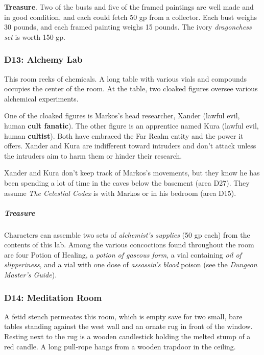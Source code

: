 \documentclass[10pt,a4paper,twoside,bg=print,twocolumn,openany,nodeprecatedcode]{dndbook}
\begin{document}
\textbf{Treasure}. Two of the busts and five of the framed paintings are well made and in good condition, and each could fetch 50 gp from a collector. Each bust weighs 30 pounds, and each framed painting weighs 15 pounds. The ivory \textit{dragonchess set} is worth 150 gp.

\subsubsection{D13: Alchemy Lab}
\begin{DndReadAloud}{}
This room reeks of chemicals. A long table with various vials and compounds occupies the center of the room. At the table, two cloaked figures oversee various alchemical experiments.

\end{DndReadAloud}

One of the cloaked figures is Markos's head researcher, Xander (lawful evil, human \textbf{cult fanatic}). The other figure is an apprentice named Kura (lawful evil, human \textbf{cultist}). Both have embraced the Far Realm entity and the power it offers. Xander and Kura are indifferent toward intruders and don't attack unless the intruders aim to harm them or hinder their research.

Xander and Kura don't keep track of Markos's movements, but they know he has been spending a lot of time in the caves below the basement (area D27). They assume \textit{The Celestial Codex} is with Markos or in his bedroom (area D15).

\subparagraph{Treasure}
Characters can assemble two sets of \textit{alchemist's supplies} (50 gp each) from the contents of this lab. Among the various concoctions found throughout the room are four Potion of Healing, a \textit{potion of gaseous form}, a vial containing \textit{oil of slipperiness}, and a vial with one dose of \textit{assassin's blood} poison (see the \textit{Dungeon Master's Guide}).

\subsubsection{D14: Meditation Room}
\begin{DndReadAloud}{}
A fetid stench permeates this room, which is empty save for two small, bare tables standing against the west wall and an ornate rug in front of the window. Resting next to the rug is a wooden candlestick holding the melted stump of a red candle. A long pull-rope hangs from a wooden trapdoor in the ceiling.

\end{DndReadAloud}
\end{document}
